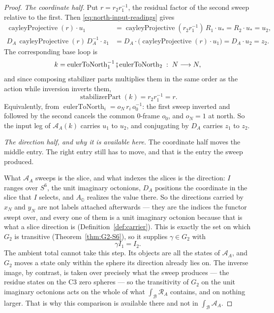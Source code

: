 \documentclass[11pt]{article}
\newcommand{\OO}{\mathbb{O}}
\theoremstyle{plain}
\theoremstyle{definition}
\theoremstyle{remark}
\begin{document}
\begin{proof}
\medskip
\noindent\emph{The coordinate half.}
Put $r=r_2r_1^{-1}$, the residual factor of the second sweep relative to the
first. Then \eqref{eq:north-input-readings} gives
\[
\begin{aligned}
  \operatorname{cayleyProjective}(r)\mathbin{\cdot}u_1
    &=\operatorname{cayleyProjective}(r_2r_1^{-1})\,
       R_1\mathbin{\cdot}u_\ast
     =R_2\mathbin{\cdot}u_\ast=u_2,\\[0.6ex]
  D_A\,\operatorname{cayleyProjective}(r)\,D_A^{-1}\mathbin{\cdot}z_1
    &=D_A\mathbin{\cdot}
       \bigl(\operatorname{cayleyProjective}(r)\mathbin{\cdot}u_1\bigr)
     =D_A\mathbin{\cdot}u_2=z_2 .
\end{aligned}
\]
The corresponding base loop is
\[
  k=\operatorname{eulerToNorth}_1^{-1}
    \fatsemi\operatorname{eulerToNorth}_2\;:\;N\longrightarrow N,
\]
and since composing stabilizer parts multiplies them in the same order as the
action while inversion inverts them,
\[
  \operatorname{stabilizerPart}(k)=r_2r_1^{-1}=r .
                                    \tag{R}\label{eq:north-relative-stabilizer}
\]
Equivalently, from $\operatorname{eulerToNorth}_i=o_N\,r_i\,o_0^{-1}$: the first
sweep inverted and followed by the second cancels the common $0$-frame $o_0$,
and $o_N=1$ at north. So the input leg of $\mathcal A_A(k)$ carries $u_1$ to
$u_2$, and conjugating by $D_A$ carries $z_1$ to $z_2$.

\medskip
\noindent\emph{The direction half, and why it is available here.}
The coordinate half moves the middle entry. The right entry still has to move,
and that is the entry the sweep produced.

What $\mathcal A_A$ sweeps is the slice, and what indexes the slices is the
direction: $I$ ranges over $S^6$, the unit imaginary octonions, $D_A$ positions
the coordinate in the slice that $I$ selects, and $A_{\OO}$ realizes the value
there. So the directions carried by $x_N$ and $y_N$ are not labels attached
afterwards --- they are the indices the functor swept over, and every one of
them is a unit imaginary octonion because that is what a slice direction is
\textup{(}Definition~\ref{def:carrier}\textup{)}. This is exactly the set on
which $G_2$ is transitive \textup{(}Theorem~\ref{thm:G2-S6}\textup{)}, so it
supplies $\gamma\in G_2$ with
\[
  \gamma I_1=I_2 .
\]
The ambient total cannot take this step. Its objects are all the states of
$\mathcal A_A$, and $G_2$ moves a state only within the sphere its direction
already lies on. The inverse image, by contrast, is taken over precisely what
the sweep produces --- the residue states on the C3 zero spheres --- so the
transitivity of $G_2$ on the unit imaginary octonions acts on the whole of what
$\int_{\mathcal B}\mathcal R_A$ contains, and on nothing larger. That is why
this comparison is available there and not in $\int_{\mathcal B}\mathcal A_A$.


\end{proof}
\end{document}
